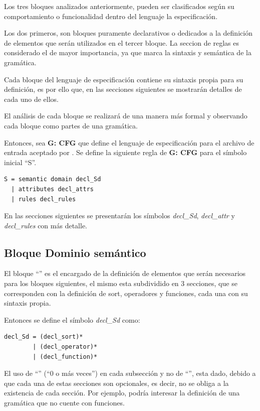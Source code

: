 Los tres bloques analizados anteriormente, pueden ser clasificados según su comportamiento o funcionalidad dentro del lenguaje la especificación.

Los dos primeros, son bloques puramente declarativos o dedicados a la definición de elementos que serán utilizados en el tercer bloque. La seccion de reglas es considerado el de mayor importancia, ya que marca la sintaxis y semántica de la gramática.

Cada bloque del lenguaje de especificación contiene su sintaxis propia para su definición, es por ello que, en las secciones siguientes se mostrarán detalles de cada uno de ellos.

El análisis de cada bloque se realizará de una manera más formal y observando cada bloque como partes de una gramática.

Entonces, sea \textbf{G: CFG} que define el lenguaje de especificación para el archivo de entrada aceptado por \maggen. Se define la siguiente regla de \textbf{G: CFG} para el símbolo inicial ``S''.

\begin{lstlisting}[frame=shadowbox, language=specmag, linewidth=8cm]
S = semantic domain decl_Sd
  | attributes decl_attrs
  | rules decl_rules
\end{lstlisting}

En las secciones siguientes se presentarán los símbolos \textit{decl\_Sd}, \textit{decl\_attr} y \textit{decl\_rules} con más detalle.  

\subsection{Bloque Dominio semántico}
\label{subsec:bloq-sem}
El bloque ``'' es el encargado de la definición de elementos que serán necesarios para los bloques siguientes, el mismo esta subdividido en 3 secciones, que se corresponden con la definición de sort, operadores y funciones, cada una con su sintaxis propia. 

Entonces se define el símbolo \textit{decl\_Sd} como:

\begin{lstlisting}[frame=shadowbox, language=specmag, linewidth=8cm]
decl_Sd = (decl_sort)*
        | (decl_operator)*
        | (decl_function)*
\end{lstlisting}

El uso de ``\textbtt{*}'' (``0 o más veces'') en cada subsección y no de ``\textbtt{+}'', esta dado, debido a que cada una de estas secciones son opcionales, es decir, no se obliga a la existencia de cada sección. Por ejemplo, podría interesar la definición de una gramática que no cuente con funciones.

